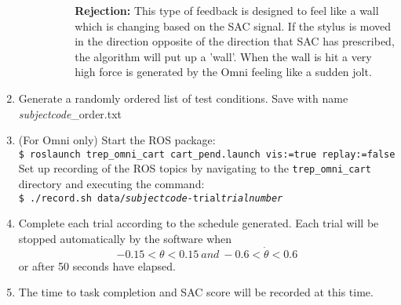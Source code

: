 \documentclass[11pt]{article}
\begin{document}
\begin{enumerate}
\begin{enumerate}
\begin{enumerate}
\begin{enumerate}
			\item[\textbf{Rejection:}] This type of feedback is designed to feel like a wall which is changing based on the SAC signal. If the stylus is moved in the direction opposite of the direction that SAC has prescribed, the algorithm will put up a 'wall'. When the wall is hit a very high force is generated by the Omni feeling like a sudden jolt.
			\end{enumerate}
		\end{enumerate}		  
	\end{enumerate}
	
\item Generate a randomly ordered list of test conditions. Save with name \textsl{\textsf{subjectcode}}\_order.txt
\item (For Omni only) Start the ROS package:\\
\texttt{\$ roslaunch trep\_omni\_cart cart\_pend.launch vis:=true replay:=false}\\ Set up recording of the ROS topics by navigating to the \texttt{trep\_omni\_cart} directory and executing the command:\\ \texttt{\$ ./record.sh data/\textsl{\textsf{subjectcode}}-trial\textsl{\textsf{trialnumber}}}
\item Complete each trial according to the schedule generated. Each trial will be stopped automatically by the software when $$-0.15<\theta<0.15\ and\ -0.6<\dot{\theta}<0.6$$ or after 50 seconds have elapsed.

\item The time to task completion and SAC score will be recorded at this time.
\end{enumerate}
\end{document}
